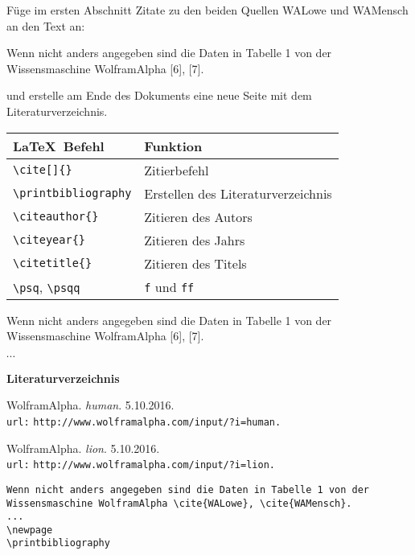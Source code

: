 \documentclass["WS\space 16-17\space -\space LaTeX-Kurs\space -\space Praesentation\space -\space 3.tex"]{subfiles}
\begin{document}
\begin{frame}[fragile]
	\begin{Aufgabe}
		Füge im ersten Abschnitt  Zitate zu den beiden Quellen \textrm{WALowe} und \textrm{WAMensch} an den Text an:
		\begin{outputbox}
			Wenn nicht anders angegeben sind die Daten in Tabelle 1 von der Wissensmaschine WolframAlpha [6], [7].
		\end{outputbox}
		und erstelle am Ende des Dokuments eine neue Seite mit dem Literaturverzeichnis.
	\end{Aufgabe}
	\btVFill\Befehle
	\begin{center}
		\begin{tabular}{ll}
			\toprule
			\LaTeX\ Befehl							&	Funktion					\\ \midrule
			\lstinline|\cite[]{}|					&	Zitierbefehl\\
			\lstinline|\printbibliography|			&	Erstellen des Literaturverzeichnis\\
			\lstinline|\citeauthor{}|				&	Zitieren des Autors \\
			\lstinline|\citeyear{}|					&	Zitieren des Jahrs \\
			\lstinline|\citetitle{}|				&	Zitieren des Titels \\
			\lstinline|\psq|, \lstinline|\psqq|		&	\texttt{f} und \texttt{ff} \\
			\bottomrule
		\end{tabular}
	\end{center}
	\vspace{0.1cm}
\end{frame}
\begin{frame}[fragile]
	\Losung
	\begin{outputbox}
		Wenn nicht anders angegeben sind die Daten in Tabelle 1 von der Wissensmaschine WolframAlpha [6], [7].
	\end{outputbox}
	\linebreakrule\vspace{-0.3cm}
	$\cdots$
	\linebreakrule
	\begin{outputbox}
		{\LARGE \textbf{Literaturverzeichnis}}
		
		\makebox[1cm]{$[6]$} WolframAlpha. \textit{human}. 5.10.2016.\\
		\makebox[1cm]{} \texttt{url:} \lstinline|http://www.wolframalpha.com/input/?i=human.|
		
		\makebox[1cm]{$[7]$} WolframAlpha. \textit{lion}. 5.10.2016.\\
		\makebox[1cm]{} \texttt{url:} \lstinline|http://www.wolframalpha.com/input/?i=lion.|
	\end{outputbox}
	\Code
	\begin{lstlisting}
Wenn nicht anders angegeben sind die Daten in Tabelle 1 von der Wissensmaschine WolframAlpha \cite{WALowe}, \cite{WAMensch}.
...
\newpage
\printbibliography
	\end{lstlisting}
\end{frame}
\end{document}

